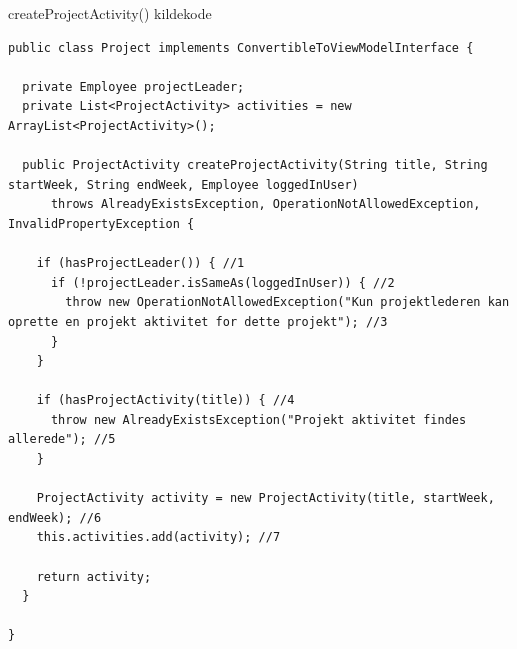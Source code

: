 \begin{listing}[H]
    \centering
    \caption{createProjectActivity() kildekode}\label{lst:create_project_activity_source}
    \begin{verbatim}
public class Project implements ConvertibleToViewModelInterface {

  private Employee projectLeader;
  private List<ProjectActivity> activities = new ArrayList<ProjectActivity>();

  public ProjectActivity createProjectActivity(String title, String startWeek, String endWeek, Employee loggedInUser)
      throws AlreadyExistsException, OperationNotAllowedException, InvalidPropertyException {
        
    if (hasProjectLeader()) { //1
      if (!projectLeader.isSameAs(loggedInUser)) { //2
        throw new OperationNotAllowedException("Kun projektlederen kan oprette en projekt aktivitet for dette projekt"); //3
      }
    }
    
    if (hasProjectActivity(title)) { //4
      throw new AlreadyExistsException("Projekt aktivitet findes allerede"); //5
    }
    
    ProjectActivity activity = new ProjectActivity(title, startWeek, endWeek); //6
    this.activities.add(activity); //7

    return activity;
  }
  
}



\end{verbatim}
\end{listing}

